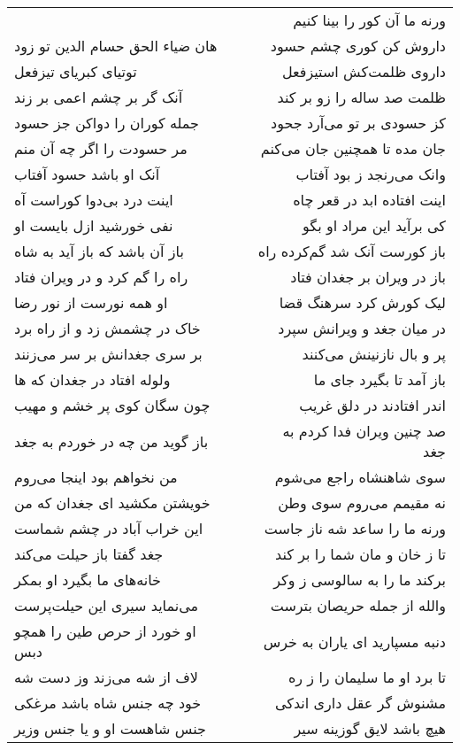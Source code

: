 \begin{center}
\begin{longtable}{l p{0.5cm} r}
&&
ورنه ما آن کور را بینا کنیم
\\
هان ضیاء الحق حسام الدین تو زود
&&
داروش کن کوری چشم حسود
\\
توتیای کبریای تیزفعل
&&
داروی ظلمت‌کش استیزفعل
\\
آنک گر بر چشم اعمی بر زند
&&
ظلمت صد ساله را زو بر کند
\\
جمله کوران را دواکن جز حسود
&&
کز حسودی بر تو می‌آرد جحود
\\
مر حسودت را اگر چه آن منم
&&
جان مده تا همچنین جان می‌کنم
\\
آنک او باشد حسود آفتاب
&&
وانک می‌رنجد ز بود آفتاب
\\
اینت درد بی‌دوا کوراست آه
&&
اینت افتاده ابد در قعر چاه
\\
نفی خورشید ازل بایست او
&&
کی برآید این مراد او بگو
\\
باز آن باشد که باز آید به شاه
&&
باز کورست آنک شد گم‌کرده راه
\\
راه را گم کرد و در ویران فتاد
&&
باز در ویران بر جغدان فتاد
\\
او همه نورست از نور رضا
&&
لیک کورش کرد سرهنگ قضا
\\
خاک در چشمش زد و از راه برد
&&
در میان جغد و ویرانش سپرد
\\
بر سری جغدانش بر سر می‌زنند
&&
پر و بال نازنینش می‌کنند
\\
ولوله افتاد در جغدان که ها
&&
باز آمد تا بگیرد جای ما
\\
چون سگان کوی پر خشم و مهیب
&&
اندر افتادند در دلق غریب
\\
باز گوید من چه در خوردم به جغد
&&
صد چنین ویران فدا کردم به جغد
\\
من نخواهم بود اینجا می‌روم
&&
سوی شاهنشاه راجع می‌شوم
\\
خویشتن مکشید ای جغدان که من
&&
نه مقیمم می‌روم سوی وطن
\\
این خراب آباد در چشم شماست
&&
ورنه ما را ساعد شه ناز جاست
\\
جغد گفتا باز حیلت می‌کند
&&
تا ز خان و مان شما را بر کند
\\
خانه‌های ما بگیرد او بمکر
&&
برکند ما را به سالوسی ز وکر
\\
می‌نماید سیری این حیلت‌پرست
&&
والله از جمله حریصان بترست
\\
او خورد از حرص طین را همچو دبس
&&
دنبه مسپارید ای یاران به خرس
\\
لاف از شه می‌زند وز دست شه
&&
تا برد او ما سلیمان را ز ره
\\
خود چه جنس شاه باشد مرغکی
&&
مشنوش گر عقل داری اندکی
\\
جنس شاهست او و یا جنس وزیر
&&
هیچ باشد لایق گوزینه سیر

\end{longtable}
\end{center}
